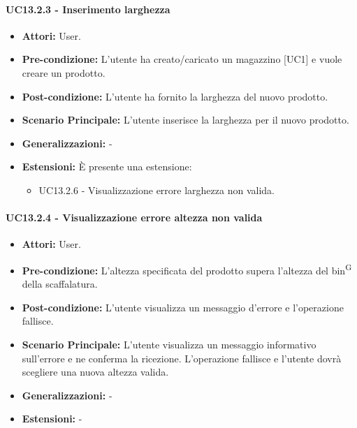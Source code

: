 \paragraph{UC13.2.3 - Inserimento larghezza}
\begin{itemize}
    \item \textbf{Attori:} User.
    \item \textbf{Pre-condizione:}  L'utente ha creato/caricato un magazzino [UC1] e vuole creare un prodotto.
    \item \textbf{Post-condizione:} L'utente ha fornito la larghezza del nuovo prodotto.
    \item \textbf{Scenario Principale:}  L'utente inserisce la larghezza per il nuovo prodotto.
    \item \textbf{Generalizzazioni:} -
    \item \textbf{Estensioni:} È presente una estensione:
    \begin{itemize}
        \item UC13.2.6 - Visualizzazione errore larghezza non valida.
    \end{itemize}
\end{itemize}


\paragraph{UC13.2.4 - Visualizzazione errore altezza non valida}
\begin{itemize}
    \item \textbf{Attori:} User.
    \item \textbf{Pre-condizione:}  L'altezza specificata del prodotto supera l'altezza del bin\textsuperscript{G} della scaffalatura.
    \item \textbf{Post-condizione:} L'utente visualizza un messaggio d'errore e l'operazione fallisce.
    \item \textbf{Scenario Principale:}  L'utente visualizza un messaggio informativo sull'errore e ne conferma la ricezione. L'operazione fallisce e l'utente dovrà scegliere una nuova altezza valida.
    \item \textbf{Generalizzazioni:} -
    \item \textbf{Estensioni:} -
\end{itemize}


